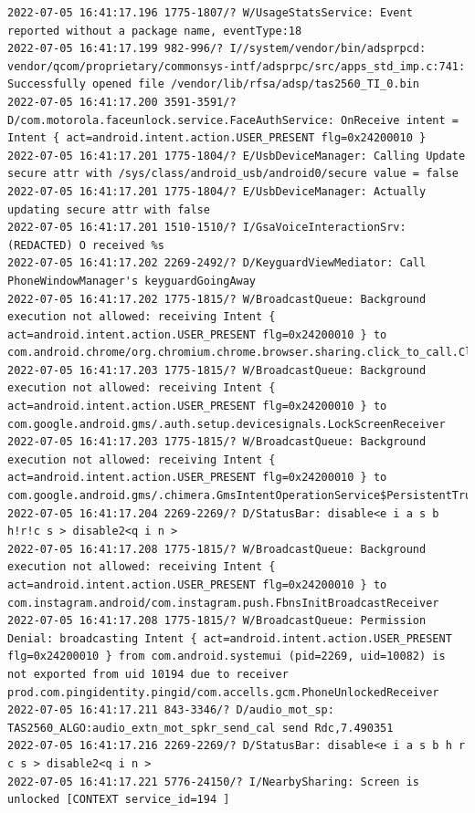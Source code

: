 \documentclass[a4paper,12pt]{book}
\begin{document}
\begin{lstlisting}
2022-07-05 16:41:17.196 1775-1807/? W/UsageStatsService: Event reported without a package name, eventType:18
2022-07-05 16:41:17.199 982-996/? I//system/vendor/bin/adsprpcd: vendor/qcom/proprietary/commonsys-intf/adsprpc/src/apps_std_imp.c:741: Successfully opened file /vendor/lib/rfsa/adsp/tas2560_TI_0.bin
2022-07-05 16:41:17.200 3591-3591/? D/com.motorola.faceunlock.service.FaceAuthService: OnReceive intent = Intent { act=android.intent.action.USER_PRESENT flg=0x24200010 }
2022-07-05 16:41:17.201 1775-1804/? E/UsbDeviceManager: Calling Update secure attr with /sys/class/android_usb/android0/secure value = false
2022-07-05 16:41:17.201 1775-1804/? E/UsbDeviceManager: Actually updating secure attr with false
2022-07-05 16:41:17.201 1510-1510/? I/GsaVoiceInteractionSrv: (REDACTED) O received %s
2022-07-05 16:41:17.202 2269-2492/? D/KeyguardViewMediator: Call PhoneWindowManager's keyguardGoingAway
2022-07-05 16:41:17.202 1775-1815/? W/BroadcastQueue: Background execution not allowed: receiving Intent { act=android.intent.action.USER_PRESENT flg=0x24200010 } to com.android.chrome/org.chromium.chrome.browser.sharing.click_to_call.ClickToCallMessageHandler$PhoneUnlockedReceiver
2022-07-05 16:41:17.203 1775-1815/? W/BroadcastQueue: Background execution not allowed: receiving Intent { act=android.intent.action.USER_PRESENT flg=0x24200010 } to com.google.android.gms/.auth.setup.devicesignals.LockScreenReceiver
2022-07-05 16:41:17.203 1775-1815/? W/BroadcastQueue: Background execution not allowed: receiving Intent { act=android.intent.action.USER_PRESENT flg=0x24200010 } to com.google.android.gms/.chimera.GmsIntentOperationService$PersistentTrustedReceiver
2022-07-05 16:41:17.204 2269-2269/? D/StatusBar: disable<e i a s b h!r!c s > disable2<q i n >
2022-07-05 16:41:17.208 1775-1815/? W/BroadcastQueue: Background execution not allowed: receiving Intent { act=android.intent.action.USER_PRESENT flg=0x24200010 } to com.instagram.android/com.instagram.push.FbnsInitBroadcastReceiver
2022-07-05 16:41:17.208 1775-1815/? W/BroadcastQueue: Permission Denial: broadcasting Intent { act=android.intent.action.USER_PRESENT flg=0x24200010 } from com.android.systemui (pid=2269, uid=10082) is not exported from uid 10194 due to receiver prod.com.pingidentity.pingid/com.accells.gcm.PhoneUnlockedReceiver
2022-07-05 16:41:17.211 843-3346/? D/audio_mot_sp: TAS2560_ALGO:audio_extn_mot_spkr_send_cal send Rdc,7.490351
2022-07-05 16:41:17.216 2269-2269/? D/StatusBar: disable<e i a s b h r c s > disable2<q i n >
2022-07-05 16:41:17.221 5776-24150/? I/NearbySharing: Screen is unlocked [CONTEXT service_id=194 ]

\end{lstlisting}
\end{document}
